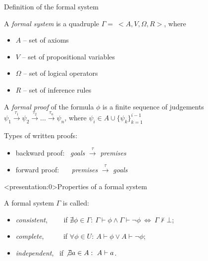 \documentclass[aspectratio=169, 12pt, fleqn]{beamer}
\begin{document}
\begin{frame}{Definition of the formal system}

A \textit{formal system} is a quadruple $\Gamma = \ <A, V, \Omega, R>$, where
\begin{itemize}
  \item $A$ -- set of axioms
  \item $V$ -- set of propositional variables
  \item $\Omega$ -- set of logical operators
  \item $R$ -- set of inference rules
\end{itemize} 

\vspace{15pt}
A \textit{formal proof} of the formula $\phi$ is a finite sequence of judgements 
\newline
$\psi_1 \xrightarrow{\tau_1} \psi_2 \xrightarrow{\tau_2} ... \xrightarrow{\tau_n} \psi_n$, where $\psi_i \in A \cup \{ \psi_k \}_{k=1}^{i-1}$

\vspace{15pt}
Types of written proofs:
\begin{itemize}
  \item backward proof: \ \textit{goals} $\xrightarrow{\tau}$ \textit{premises}
  \item forward proof: \ \ \ \textit{premises} $\xrightarrow{\tau}$ \textit{goals}
\end{itemize}
\end{frame}


\begin{frame}<presentation:0>{Properties of a formal system}

A formal system $\Gamma$ is called:
\begin{itemize}
\item  \textit{consistent}, \ \ \ \ if $\nexists \phi \in \Gamma: \ \Gamma \vdash \phi \land  \Gamma \vdash \neg \phi  \ \Leftrightarrow \ \Gamma \nvdash \bot$; 
\\ \vspace{3pt}
\item \textit{complete}, \ \ \ \ \ if $\forall \phi \in U: \ A \vdash \phi \lor A \vdash \neg \phi$;
\\ \vspace{3pt}
\item \textit{independent}, \ if $\not \exists a \in A: \ A \vdash a$.
\end{itemize}
\end{frame}
\end{document}
